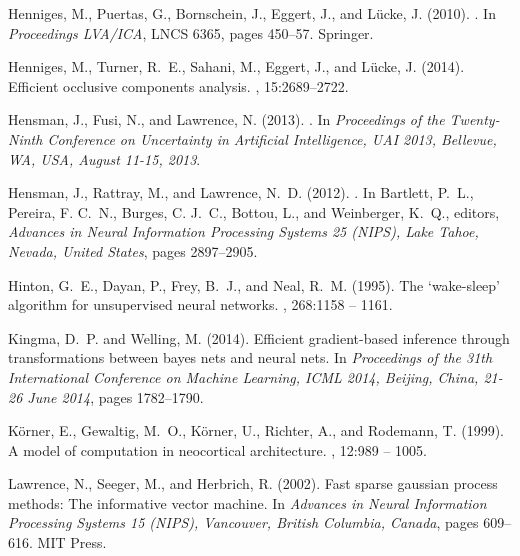 \documentclass[12pt]{article}
\begin{document}
\begin{thebibliography}{}
Henniges, M., Puertas, G., Bornschein, J., Eggert, J., and L\"ucke, J. (2010).
.
\newblock In {\em Proceedings LVA/ICA}, LNCS 6365, pages 450--57. Springer.

Henniges, M., Turner, R.~E., Sahani, M., Eggert, J., and L{{\"u}}cke, J.
  (2014).
\newblock Efficient occlusive components analysis.
, 15:2689--2722.

Hensman, J., Fusi, N., and Lawrence, N. (2013).
.
\newblock In {\em Proceedings of the Twenty-Ninth Conference on Uncertainty in
  Artificial Intelligence, {UAI} 2013, Bellevue, WA, USA, August 11-15, 2013}.

Hensman, J., Rattray, M., and Lawrence, N.~D. (2012).
.
\newblock In Bartlett, P.~L., Pereira, F. C.~N., Burges, C. J.~C., Bottou, L.,
  and Weinberger, K.~Q., editors, {\em Advances in Neural Information
  Processing Systems 25 ({NIPS}), Lake Tahoe, Nevada, United States}, pages
  2897--2905.

Hinton, G.~E., Dayan, P., Frey, B.~J., and Neal, R.~M. (1995).
\newblock The `wake-sleep' algorithm for unsupervised neural networks.
, 268:1158 -- 1161.

Kingma, D.~P. and Welling, M. (2014).
\newblock Efficient gradient-based inference through transformations between
  bayes nets and neural nets.
\newblock In {\em Proceedings of the 31th International Conference on Machine
  Learning, {ICML} 2014, Beijing, China, 21-26 June 2014}, pages 1782--1790.

K\"orner, E., Gewaltig, M.~O., K\"orner, U., Richter, A., and Rodemann, T.
  (1999).
\newblock A model of computation in neocortical architecture.
, 12:989 -- 1005.

Lawrence, N., Seeger, M., and Herbrich, R. (2002).
\newblock Fast sparse gaussian process methods: The informative vector machine.
\newblock In {\em Advances in Neural Information Processing Systems 15
  ({NIPS}), Vancouver, British Columbia, Canada}, pages 609--616. MIT Press.


\end{thebibliography}
\end{document}
